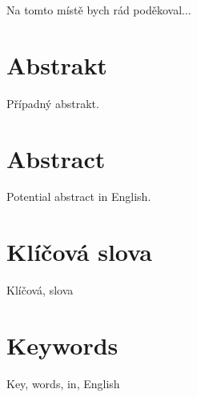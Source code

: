 \documentclass[a4paper,12pt,openany,twoside]{book} %
\begin{document}
\par
\par\vspace*{\fill}

Na tomto místě bych rád poděkoval...

\clearpage

\section*{Abstrakt}

Případný abstrakt.

\section*{Abstract}

Potential abstract in English.

\section*{Klíčová slova}

Klíčová, slova

\section*{Keywords}

Key, words, in, English

\clearpage

\tableofcontents


\cleardoublepage
{}







\clearpage

\pagestyle{plain}

\begin{spacing}{1.05}
\printbibliography[title={Seznam literatury}]
\end{spacing}
\end{document}
